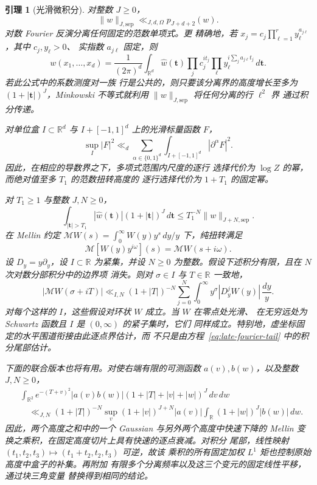 \documentclass[11pt,a4paper]{article}
\numberwithin{equation}{section}
\numberwithin{figure}{section}
\newtheorem{lemma}[theorem]{引理}
\theoremstyle{definition}
\theoremstyle{remark}
\begin{document}
\begin{lemma}[光滑微积分]\label{lem:smooth-calculus}
对整数 $J\ge0$，
\[
 \|w\|_{J,\mathrm{sep}}\ll_{J,d,\Omega}p_{J+d+2}(w).
\]
对数 Fourier 反演分离任何固定的范数单项式。更
精确地，若 $x_j=c_j\prod_{\ell=1}^r y_\ell^{a_{j\ell}}$，其中 $c_j,y_\ell>0$、
实指数 $a_{j\ell}$ 固定，则
\[
 w(x_1,\ldots,x_d)=\frac1{(2\pi)^d}\int_{\mathbb R^d}
 \widehat w(\boldsymbol t)\prod_j c_j^{it_j}
       \prod_\ell y_\ell^{i\sum_j a_{j\ell}t_j}\,d\boldsymbol t.
\]
若此公式中的系数测度对一族
行是公共的，则只要该分离界的高度增长至多为
$(1+|\boldsymbol t|)^J$，Minkowski 不等式就利用 $\|w\|_{J,\mathrm{sep}}$ 将任何分离的行 $\ell^2$ 界
通过积分传递。

对单位盒 $I\subset\mathbb R^d$ 与 $I+[-1,1]^d$ 上的光滑标量函数
$F$，
\begin{equation}\label{eq:parameter-sobolev}
 \sup_I|F|^2\ll_d
 \sum_{\alpha\in\{0,1\}^d}
 \int_{I+[-1,1]^d}|\partial^\alpha F|^2.
\end{equation}
因此，在相应的导数界之下，多项式范围内尺度的逐行
选择代价为 $\log Z$ 的幂，而绝对值至多 $T_1$ 的范数扭转高度的
逐行选择代价为 $1+T_1$ 的固定幂。

对 $T_1\ge1$ 与整数 $J,N\ge0$，
\begin{equation}\label{eq:late-fourier-tail}
 \int_{|\boldsymbol t|>T_1}|\widehat w(\boldsymbol t)|
             (1+|\boldsymbol t|)^J\,d\boldsymbol t
 \le T_1^{-N}\|w\|_{J+N,\mathrm{sep}}.
\end{equation}
在 Mellin 约定
$\mathcal MW(s)=\int_0^\infty W(y)y^s\,dy/y$ 下，纯扭转满足
\[
 \mathcal M[W(y)y^{i\omega}](s)=\mathcal MW(s+i\omega).
\]
设 $D_y=y\partial_y$，设 $I\subset\mathbb R$ 为紧集，并设 $N\ge0$
为整数。假设下述积分有限，且在 $N$ 次对数分部积分中的边界项
消失。则对
$\sigma\in I$ 与 $T\in\mathbb R$ 一致地，
\begin{equation}\label{eq:pointwise-mellin-tail}
 |\mathcal MW(\sigma+iT)|
 \ll_{I,N}(1+|T|)^{-N}
     \sum_{j=0}^N\int_0^\infty y^\sigma|D_y^jW(y)|\,\frac{dy}{y}.
\end{equation}
对每个这样的 $I$，这些假设对环状 $W$ 成立。当 $W$ 在零点处光滑、
在无穷远处为 Schwartz 函数且 $I$ 是 $(0,\infty)$ 的紧子集时，它们
同样成立。特别地，虚坐标固定的水平围道衔接由此逐点界估计，而
不只是由方程~\eqref{eq:late-fourier-tail} 中的积分尾部估计。

下面的联合版本也将有用。对使右端有限的可测函数
$a(v),b(w)$，以及整数 $J,N\ge0$，
\begin{equation}\label{eq:joint-gaussian-slice}
 \begin{split}
 &\int_{\mathbb R^2}e^{-(T+v)^2}|a(v)b(w)|
       (1+|T|+|v|+|w|)^J\,dv\,dw\\
 &\quad\ll_{J,N}(1+|T|)^{-N}
       \sup_v(1+|v|)^{J+N}|a(v)|
       \int_{\mathbb R}(1+|w|)^J|b(w)|\,dw.
 \end{split}
\end{equation}
因此，两个高度之和中的一个 Gaussian 与另外两个高度中快速下降的
Mellin 变换之乘积，在固定高度切片上具有快速的逐点衰减。对积分
尾部，线性映射 $(t_1,t_2,t_3)\mapsto(t_1+t_2,t_2,t_3)$ 可逆，故该
乘积的所有固定加权 $L^1$ 矩也控制原始高度中盒子的补集。再附加
有限多个分离频率以及这三个变元的固定线性平移，通过块三角变量
替换得到相同的结论。


\end{lemma}
\end{document}

